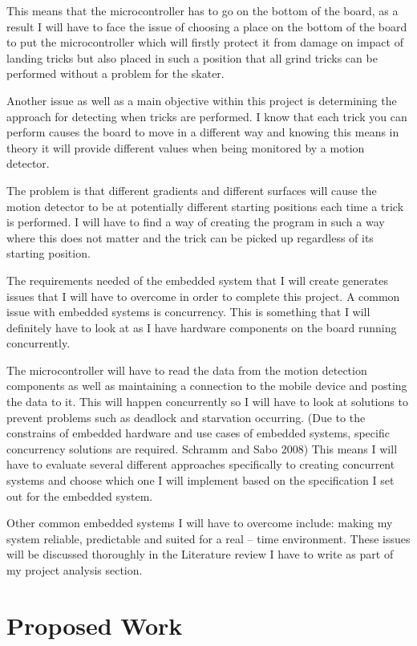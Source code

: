 This means that the microcontroller has to go on the bottom of the board, as a result I will have to face the issue of choosing a place on the bottom of the board to put the microcontroller which will firstly protect it from damage on impact of landing tricks but also placed in such a position that all grind tricks can be performed without a problem for the skater.

Another issue as well as a main objective within this project is determining the approach for detecting when tricks are performed. I know that each trick you can perform causes the board to move in a different way and knowing this means in theory it will provide different values when being monitored by a motion detector. 

The problem is that different gradients and different surfaces will cause the motion detector to be at potentially different starting positions each time a trick is performed. I will have to find a way of creating the program in such a way where this does not matter and the trick can be picked up regardless of its starting position. 

The requirements needed of the embedded system that I will create generates issues that I will have to overcome in order to complete this project. A common issue with embedded systems is concurrency. This is something that I will definitely have to look at as I have hardware components on the board running concurrently. 

The microcontroller will have to read the data from the motion detection components as well as maintaining a connection to the mobile device and posting the data to it. This will happen concurrently so I will have to look at solutions to prevent problems such as deadlock and starvation occurring. (Due to the constrains of embedded hardware and use cases of embedded systems, specific concurrency solutions are required.  Schramm and Sabo 2008) This means I will have to evaluate several different approaches specifically to creating concurrent systems and choose which one I will implement based on the specification I set out for the embedded system.

Other common embedded systems I will have to overcome include: making my system reliable, predictable and suited for a real – time environment. These issues will be discussed thoroughly in the Literature review I have to write as part of my project analysis section.
\section{Proposed Work}\label{tor:proposedwork}
